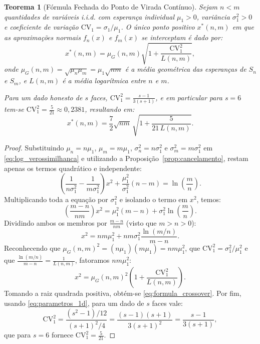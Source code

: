 \documentclass[11pt,a4paper]{article}
\newtheorem{theorem}{Teorema}[section]
\theoremstyle{definition}
\theoremstyle{remark}
\begin{document}
\begin{theorem}[Fórmula Fechada do Ponto de Virada Contínuo]
\label{thm:crossover}
Sejam $n < m$ quantidades de variáveis i.i.d. com esperança individual $\mu_1 > 0$, variância $\sigma_1^2 > 0$ e coeficiente de variação $\mathrm{CV}_1 = \sigma_1 / \mu_1$. O único ponto positivo $x^*(n,m)$ em que as aproximações normais $f_n(x)$ e $f_m(x)$ se interceptam é dado por:
\begin{equation}
x^*(n, m) = \mu_G(n, m) \sqrt{1 + \frac{\mathrm{CV}_1^2}{L(n, m)}},
\label{eq:formula_crossover}
\end{equation}
onde $\mu_G(n,m) = \sqrt{\mu_n \mu_m} = \mu_1 \sqrt{nm}$ é a média geométrica das esperanças de $S_n$ e $S_m$, e $L(n,m)$ é a média logarítmica entre $n$ e $m$.

Para um dado honesto de $s$ faces, $\mathrm{CV}_1^2 = \frac{s - 1}{3(s + 1)}$, e em particular para $s = 6$ tem-se $\mathrm{CV}_1^2 = \frac{5}{21} \approx 0{,}2381$, resultando em:
\begin{equation}
x^*(n, m) = \frac{7}{2}\sqrt{nm} \, \sqrt{1 + \frac{5}{21\, L(n, m)}}.
\label{eq:formula_6faces}
\end{equation}
\end{theorem}

\begin{proof}
Substituindo $\mu_n = n\mu_1$, $\mu_m = m\mu_1$, $\sigma_n^2 = n\sigma_1^2$ e $\sigma_m^2 = m\sigma_1^2$ em \eqref{eq:log_verossimilhanca} e utilizando a Proposição~\ref{prop:cancelamento}, restam apenas os termos quadrático e independente:
\[
\left(\frac{1}{n\sigma_1^2} - \frac{1}{m\sigma_1^2}\right) x^2 + \frac{\mu_1^2}{\sigma_1^2}(n - m) = \ln\!\left(\frac{m}{n}\right).
\]
Multiplicando toda a equação por $\sigma_1^2$ e isolando o termo em $x^2$, temos:
\[
\left(\frac{m - n}{nm}\right) x^2 = \mu_1^2 (m - n) + \sigma_1^2 \ln\!\left(\frac{m}{n}\right).
\]
Dividindo ambos os membros por $\frac{m - n}{nm}$ (visto que $m > n > 0$):
\[
x^2 = nm\mu_1^2 + nm\sigma_1^2 \frac{\ln(m/n)}{m - n}.
\]
Reconhecendo que $\mu_G(n,m)^2 = (n\mu_1)(m\mu_1) = nm\mu_1^2$, que $\mathrm{CV}_1^2 = \sigma_1^2 / \mu_1^2$ e que $\frac{\ln(m/n)}{m - n} = \frac{1}{L(n,m)}$, fatoramos $nm\mu_1^2$:
\[
x^2 = \mu_G(n, m)^2 \left(1 + \frac{\mathrm{CV}_1^2}{L(n, m)}\right).
\]
Tomando a raiz quadrada positiva, obtém-se \eqref{eq:formula_crossover}. Por fim, usando \eqref{eq:parametros_1d}, para um dado de $s$ faces vale:
\[
\mathrm{CV}_1^2 = \frac{(s^2 - 1)/12}{(s + 1)^2 / 4} = \frac{(s - 1)(s + 1)}{3(s + 1)^2} = \frac{s - 1}{3(s + 1)},
\]
que para $s = 6$ fornece $\mathrm{CV}_1^2 = \frac{5}{21}$.
\end{proof}
\end{document}
